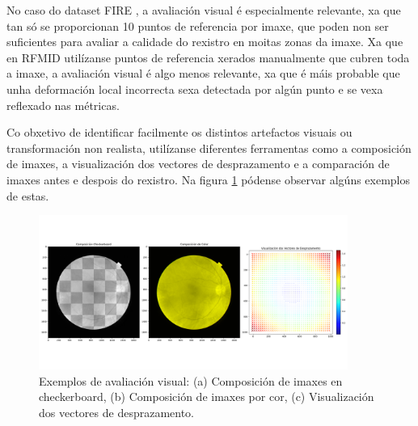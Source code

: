 No caso do dataset FIRE \cite{FIRE}, a avaliación visual é especialmente relevante, xa que tan só se proporcionan 10 puntos de referencia por imaxe, que poden non ser suficientes para avaliar a calidade do rexistro en moitas zonas da imaxe.
Xa que en RFMID \cite{RFMiD} utilízanse puntos de referencia xerados manualmente que cubren toda a imaxe, a avaliación visual é algo menos relevante, xa que é máis probable que unha deformación local incorrecta sexa detectada por algún punto e se vexa reflexado nas métricas.

Co obxetivo de identificar facilmente os distintos artefactos visuais ou transformación non realista, utilízanse diferentes ferramentas como a composición de imaxes, a visualización dos vectores de desprazamento e a comparación de imaxes antes e despois do rexistro.
Na figura \ref{fig:visex} pódense observar algúns exemplos de estas.

\begin{figure}[tbp]
    \centering
    \includegraphics[width=0.9\textwidth]{imaxes/visex.png}
    \caption{Exemplos de avaliación visual: (a) Composición de imaxes en checkerboard, (b) Composición de imaxes por cor, (c) Visualización dos vectores de desprazamento.}
    \label{fig:visex}
\end{figure}